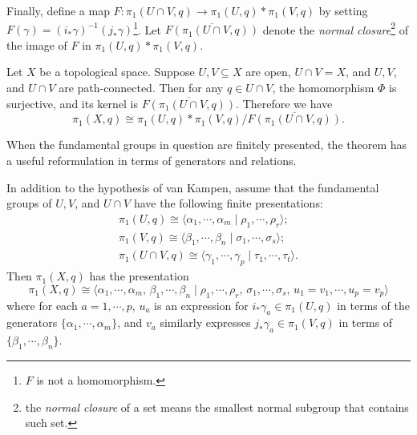                         \begin{figure}[H]
                \centering
            \end{figure}
            Finally, define a map $F \colon \pi_1(U\cap V,q) \to \pi_1(U,q)*\pi_1(V,q)$ by setting $F(\gamma)=(i_*\gamma)^{-1}(j_*\gamma)$\footnote{$F$ is not a homomorphism.}. Let $\overline{F(\pi_1(U\cap V,q))}$ denote the \emph{normal closure}\footnote{the \emph{normal closure} of a set means the smallest normal subgroup that contains such set.} of the image of $F$ in $\pi_1(U,q)*\pi_1(V,q)$.

\begin{theorem}
    Let $X$ be a topological space. Suppose $U,V\subseteq X$ are open, $U\cap V=X$, and $U,V$, and $U\cap V$ are path-connected. Then for any $q\in U\cap V$, the homomorphism $\Phi$ is surjective, and its kernel is $\overline{F(\pi_1(U\cap V,q))}$. Therefore we have \[
        \pi_1(X,q)\cong \pi_1(U,q)*\pi_1(V,q) \big/ \overline{F(\pi_1(U\cap V,q))}.
    \] 
\end{theorem}
When the fundamental groups in question are finitely presented, the theorem has a useful reformulation in terms of generators and relations.
\begin{cor}
    In addition to the hypothesis of van Kampen, assume that the fundamental groups of $U,V$, and $U\cap V$ have the following finite presentations:
    \begin{gather*}
\pi_1(U,q)\cong \langle \alpha_1,\cdots,\alpha_m \mid \rho_1,\cdots,\rho_r \rangle;\\
\pi_1(V,q)\cong\langle \beta_1,\cdots,\beta_n \mid \sigma_1,\cdots,\sigma_s \rangle; \\
\pi_1(U\cap V,q)\cong \langle \gamma_1,\cdots,\gamma_p \mid \tau_1,\cdots,\tau_t \rangle .
    \end{gather*}
    Then $\pi_1(X,q)$ has the presentation \[
        \pi_1(X,q)\cong \langle \alpha_1,\cdots,\alpha_m,\,\beta_1,\cdots,\beta_n \mid \rho_1,\cdots,\rho_r,\,\sigma_1,\cdots,\sigma_s,\,u_1=v_1,\cdots,u_p=v_p \rangle 
    \] where for each $a=1,\cdots,p$, $u_a$ is an expression for $i_*\gamma_a\in \pi_1(U,q)$ in terms of the generators $\{\alpha_1,\cdots,\alpha_m\} $, and $v_a$ similarly expresses $j_*\gamma_a\in \pi_1(V,q)$ in terms of $\{\beta_1,\cdots,\beta_n\} $.
\end{cor}
